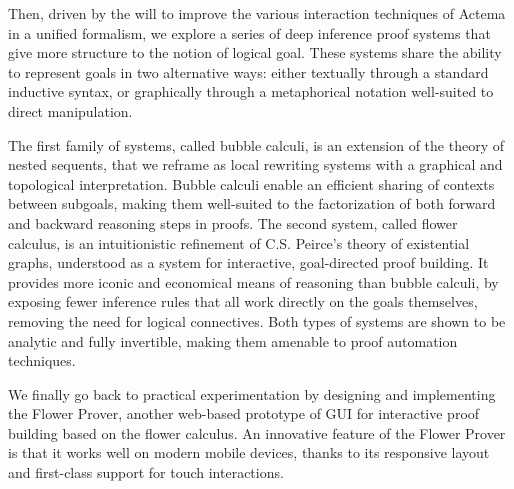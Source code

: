 
Then, driven by the will to improve the various interaction techniques of Actema
in a unified formalism, we explore a series of deep inference proof systems that
give more structure to the notion of logical goal. These systems share the
ability to represent goals in two alternative ways: either textually through a
standard inductive syntax, or graphically through a metaphorical notation
well-suited to direct manipulation.

The first family of systems, called bubble calculi, is an extension of the
theory of nested sequents, that we reframe as local rewriting systems with a
graphical and topological interpretation. Bubble calculi enable an efficient
sharing of contexts between subgoals, making them well-suited to the
factorization of both forward and backward reasoning steps in proofs. The second
system, called flower calculus, is an intuitionistic refinement of C.S. Peirce's
theory of existential graphs, understood as a system for interactive,
goal-directed proof building. It provides more iconic and economical means of
reasoning than bubble calculi, by exposing fewer inference rules that all work
directly on the goals themselves, removing the need for logical connectives.
Both types of systems are shown to be analytic and fully invertible, making them
amenable to proof automation techniques.

We finally go back to practical experimentation by designing and implementing
the Flower Prover, another web-based prototype of GUI for interactive proof
building based on the flower calculus. An innovative feature of the Flower
Prover is that it works well on modern mobile devices, thanks to its responsive
layout and first-class support for touch interactions.

